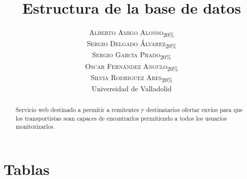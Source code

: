 \documentclass[10pt, a4paper,spanish]{article}
\title{\vspace{-15mm}\fontsize{24pt}{10pt}\selectfont\textbf{Estructura de la base de datos}} %
\author{
\large
\textsc{Alberto Amigo Alonso\textsubscript{20\%}}\\[2mm] %
\textsc{Sergio Delgado Álvarez\textsubscript{20\%}}\\[2mm] %
\textsc{Sergio García Prado\textsubscript{20\%}}\\[2mm] %
\textsc{Oscar Fernández Angulo\textsubscript{20\%}}\\[2mm] %
\textsc{Silvia Rodriguez Ares\textsubscript{20\%}}\\[2mm] %
\normalsize Universidad de Valladolid \\ %
\vspace{-5mm}
}
\date{}
\begin{document}
	\maketitle %

	\thispagestyle{fancy} %


	\begin{abstract}
		\noindent Servicio web destinado a permitir a remitentes y destinatarios ofertar envíos para que los transportistas sean capaces de encontrarlos permitiendo a todos los usuarios monitorizarlos.
	\end{abstract}



	\section{Tablas}
\end{document}
